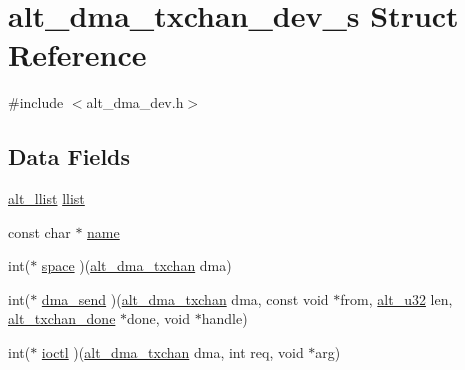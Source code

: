 \hypertarget{structalt__dma__txchan__dev__s}{\section{alt\-\_\-dma\-\_\-txchan\-\_\-dev\-\_\-s \-Struct \-Reference}
\label{structalt__dma__txchan__dev__s}
}


{\ttfamily \#include $<$alt\-\_\-dma\-\_\-dev.\-h$>$}

\subsection*{\-Data \-Fields}
\begin{DoxyCompactItemize}
\item 
\hyperlink{alt__llist_8h_a94b50b44e6bd512a432af0b840d49aa4}{alt\-\_\-llist} \hyperlink{structalt__dma__txchan__dev__s_a135bc0be285afc59289210771ad9c136}{llist}
\item 
const char $\ast$ \hyperlink{structalt__dma__txchan__dev__s_a8f8f80d37794cde9472343e4487ba3eb}{name}
\item 
int($\ast$ \hyperlink{structalt__dma__txchan__dev__s_addde7db88a5c24bfe0c1a71987a91af8}{space} )(\hyperlink{alt__dma__dev_8h_a5505d677cba39fe41438d8f13443c105}{alt\-\_\-dma\-\_\-txchan} dma)
\item 
int($\ast$ \hyperlink{structalt__dma__txchan__dev__s_a9bde2812cc0aaef511d4ed3cdacd9e67}{dma\-\_\-send} )(\hyperlink{alt__dma__dev_8h_a5505d677cba39fe41438d8f13443c105}{alt\-\_\-dma\-\_\-txchan} dma, const void $\ast$from, \hyperlink{alt__types_8h_acd6a6a2004f05f01beaa42367510d8af}{alt\-\_\-u32} len, \hyperlink{alt__dma__dev_8h_aaca32af373567438897a24c331f087a8}{alt\-\_\-txchan\-\_\-done} $\ast$done, void $\ast$handle)
\item 
int($\ast$ \hyperlink{structalt__dma__txchan__dev__s_a0bee5c0ea9d421064e4f6aabe0de3de4}{ioctl} )(\hyperlink{alt__dma__dev_8h_a5505d677cba39fe41438d8f13443c105}{alt\-\_\-dma\-\_\-txchan} dma, int req, void $\ast$arg)
\end{DoxyCompactItemize}


